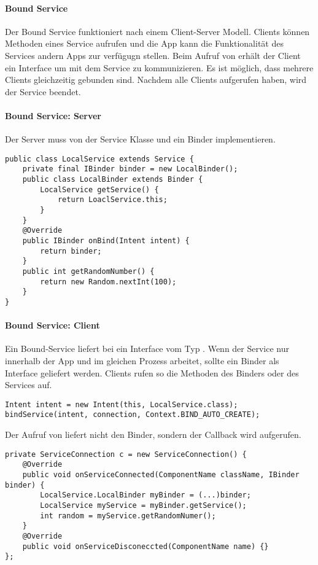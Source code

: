 \paragraph{Bound Service} Der Bound Service funktioniert nach einem Client-Server Modell. Clients können Methoden eines Service aufrufen und die App kann die Funktionalität des Services andern Apps zur verfügugn stellen. Beim Aufruf von  erhält der Client ein Interface um mit dem Service zu kommunizieren. Es ist möglich, dass mehrere Clients gleichzeitig gebunden sind. Nachdem alle Clients  aufgerufen haben, wird der Service beendet.
\paragraph{Bound Service: Server} Der Server muss von der Service Klasse und ein Binder implementieren.
\begin{lstlisting}
public class LocalService extends Service {
    private final IBinder binder = new LocalBinder();
    public class LocalBinder extends Binder {
        LocalService getService() {
            return LoaclService.this;
        }
    }
    @Override
    public IBinder onBind(Intent intent) {
        return binder;
    }
    public int getRandomNumber() {
        return new Random.nextInt(100);
    }
}
\end{lstlisting}
\paragraph{Bound Service: Client} Ein Bound-Service liefert bei  ein Interface vom Typ . Wenn der Service nur innerhalb der App und im gleichen Prozess arbeitet, sollte ein Binder als Interface geliefert werden. Clients rufen so die Methoden des Binders oder des Services auf.
\begin{lstlisting}
Intent intent = new Intent(this, LocalService.class);
bindService(intent, connection, Context.BIND_AUTO_CREATE);
\end{lstlisting}
Der Aufruf von  liefert nicht den  Binder, sondern der Callback  wird aufgerufen.
\begin{lstlisting}
private ServiceConnection c = new ServiceConnection() {
    @Override
    public void onServiceConnected(ComponentName className, IBinder binder) {
        LocalService.LocalBinder myBinder = (...)binder;
        LocalService myService = myBinder.getService();
        int random = myService.getRandomNumer();
    }
    @Override
    public void onServiceDisconeccted(ComponentName name) {}
};
\end{lstlisting}
